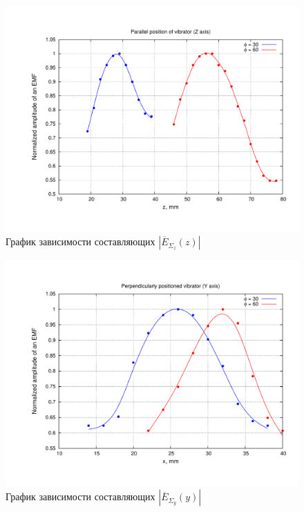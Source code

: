 \documentclass[11pt,a4paper,oneside, titlepage,reqno]{amsproc}
\begin{document}
\begin{figure}[hb!]
    \begin{center}
        \includegraphics[width=\textwidth]{plot2.pdf}
    \end{center}
    \caption{График зависимости составляющих $|\overline{E}_{\Sigma_z}(z)|$}
    \label{fig:plot2}
\end{figure}

\begin{figure}[hb!]
    \begin{center}
        \includegraphics[width=\textwidth]{plot3.pdf}
    \end{center}
    \vspace {-20 pt}
    \caption{График зависимости составляющих $|\overline{E}_{\Sigma_y}(y)|$}
    \label{fig:plot3}
\end{figure}
\end{document}
